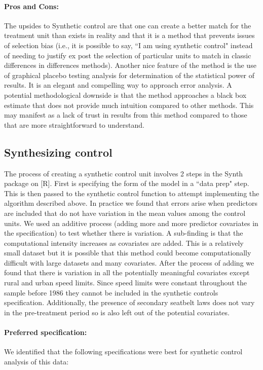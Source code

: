 \documentclass[letterpaper, 12pt]{article}
\begin{document}
\paragraph{Pros and Cons:} The upsides to Synthetic control are that one can create a better match for the treatment unit than exists in reality and that it is a method that prevents issues of selection bias (i.e., it is possible to say, ``I am using synthetic control" instead of needing to justify ex post the selection of particular units to match in classic differences in differences methods).  Another nice feature of the method is the use of graphical placebo testing analysis for determination of the statistical power of results.  It is an elegant and compelling way to approach error analysis.  A potential methodological downside is that the method approaches a black box estimate that does not provide much intuition compared to other methods.  This may manifest as a lack of trust in results from this method compared to those that are more straightforward to understand.   


\subsection{Synthesizing control} The process of creating a synthetic control unit involves 2 steps in the Synth package on [R].  First is specifying the form of the model in a ``data prep" step.  This is then passed to the synthetic control function to attempt implementing the algorithm described above.  In practice we found that errors arise when predictors are included that do not have variation in the mean values among the control units.  We used an additive process (adding more and more predictor covariates in the specification) to test whether there is variation.  A sub-finding is that the computational intensity increases as covariates are added.  This is a relatively small dataset but it is possible that this method could become computationally difficult with large datasets and many covariates.  After the process of adding we found that there is variation in all the potentially meaningful covariates except rural and urban speed limits.  Since speed limits were constant throughout the sample before 1986 they cannot be included in the synthetic controls specification.  Additionally, the presence of secondary seatbelt laws does not vary in the pre-treatment period so is also left out of the potential covariates.  

\paragraph{Preferred specification:} We identified that the following specifications were best for synthetic control analysis of this data:
\end{document}
